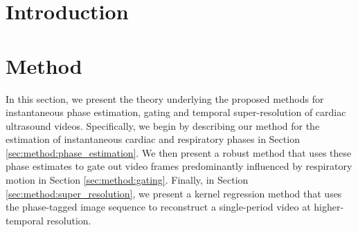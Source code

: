 \documentclass[runningheads,a4paper]{llncs}
\begin{document}
\vspace{-0.5cm}
\section{Introduction}
\label{sec:intro}
%

%

\section{Method}
\label{sec:method}
%
In this section, we present the theory underlying the proposed methods for instantaneous phase estimation, gating and temporal super-resolution of cardiac ultrasound videos. Specifically, we begin by describing our method for the estimation of instantaneous cardiac and respiratory phases in Section \ref{sec:method:phase_estimation}. We then present a robust method that uses these phase estimates to gate out video frames predominantly influenced by respiratory motion in Section \ref{sec:method:gating}. Finally, in Section \ref{sec:method:super_resolution}, we present a kernel regression method that uses the phase-tagged image sequence to reconstruct a single-period video at higher-temporal resolution. 
%
%
\end{document}
